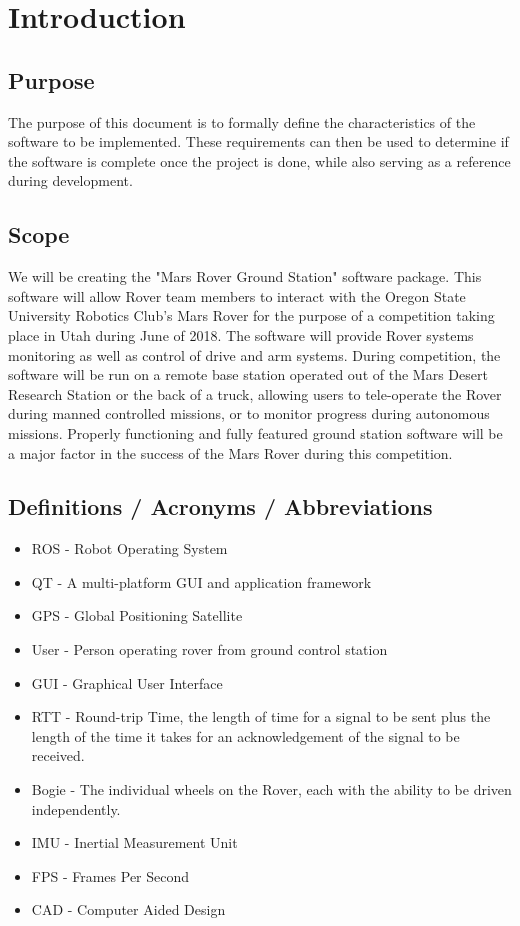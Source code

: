 \documentclass[onecolumn, draftclsnofoot, 10pt, compsoc]{IEEEtran}
\begin{document}
\section{Introduction}
\subsection{Purpose}
The purpose of this document is to formally define the characteristics of the software to be implemented. 
These requirements can then be used to determine if the software is complete once the project is done, while also serving as a reference during development.


\subsection{Scope}
We will be creating the "Mars Rover Ground Station" software package. 
This software will allow Rover team members to interact with the Oregon State University Robotics Club's Mars Rover for the purpose of a competition taking place in Utah during June of 2018. 
The software will provide Rover systems monitoring as well as control of drive and arm systems. 
During competition, the software will be run on a remote base station operated out of the Mars Desert Research Station or the back of a truck, allowing users to tele-operate the Rover during manned controlled missions, or to monitor progress during autonomous missions. 
Properly functioning and fully featured ground station software will be a major factor in the success of the Mars Rover during this competition.


\subsection{Definitions / Acronyms / Abbreviations}
\begin{itemize}
\item ROS - Robot Operating System
\item QT - A multi-platform GUI and application framework
\item GPS - Global Positioning Satellite 
\item User - Person operating rover from ground control station
\item GUI - Graphical User Interface
\item RTT - Round-trip Time, the length of time for a signal to be sent plus the length of the time it takes for an acknowledgement of the signal to be received.
\item Bogie - The individual wheels on the Rover, each with the ability to be driven independently.
\item IMU - Inertial Measurement Unit
\item FPS - Frames Per Second
\item CAD - Computer Aided Design
\end{itemize}
\end{document}
